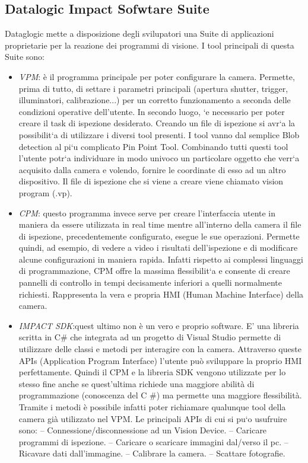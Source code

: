 \documentclass[12pt, a4paper, oneside]{book}
\begin{document}
\subsection{Datalogic Impact Sofwtare Suite}
Dataglogic mette a disposizione degli svilupatori una Suite di applicazioni proprietarie per la reazione dei programmi di visione. I tool principali di questa Suite sono:

\begin{itemize}
	\item \textit{VPM}: è il programma principale per poter configurare la camera. Permette, prima
	di tutto, di settare i parametri principali (apertura shutter, trigger, illuminatori,
	calibrazione...) per un corretto funzionamento a seconda delle condizioni operative
	dell’utente. In secondo luogo, `e necessario per poter creare il task di ispezione
	desiderato. Creando un file di ispezione si avr`a la possibilit`a di utilizzare i diversi
	tool presenti. I tool vanno dal semplice Blob detection al pi`u complicato Pin Point
	Tool. Combinando tutti questi tool l’utente potr`a individuare in modo univoco un
	particolare oggetto che verr`a acquisito dalla camera e volendo, fornire le coordinate
	di esso ad un altro dispositivo. Il file di ispezione che si viene a creare viene
	chiamato vision program (.vp).
	\item \textit{CPM}: questo programma invece serve per creare l’interfaccia utente in maniera da
	essere utilizzata in real time mentre all’interno della camera il file di ispezione, precedentemente
	configurato, esegue le sue operazioni. Permette quindi, ad esempio,
	di vedere a video i risultati dell’ispezione e di modificare alcune configurazioni in
	maniera rapida. Infatti rispetto ai complessi linguaggi di programmazione, CPM
	offre la massima flessibilit`a e consente di creare pannelli di controllo in tempi decisamente
	inferiori a quelli normalmente richiesti. Rappresenta la vera e propria
	HMI (Human Machine Interface) della camera.
	\item \textit{IMPACT SDK}:quest ultimo non è un vero e proprio software. E’ una libreria scritta in C\# che integrata ad un progetto di Visual Studio permette di utilizzare delle classi e metodi per interagire con la camera. Attraverso queste APIs (Application Program Interface) l’utente può sviluppare la proprio HMI perfettamente. Quindi il CPM e la libreria SDK vengono utilizzate per lo
	stesso fine anche se quest’ultima richiede una maggiore abilità di programmazione (conoscenza del C \#) ma permette una maggiore flessibilità. Tramite i metodi è possibile infatti poter richiamare qualunque tool della camera già utilizzato nel VPM. Le principali APIs di cui si pu`o usufruire sono:
	– Connessione/disconnessione ad un Vision Device.
	– Caricare programmi di ispezione.
	– Caricare o scaricare immagini dal/verso il pc.
	– Ricavare dati dall’immagine.
	– Calibrare la camera.
	– Scattare fotografie.
\end{itemize}
\end{document}
